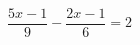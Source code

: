 \begin{ex}[type=equation]
	\begin{condition}
		$\dfrac{5x - 1}{9}-\dfrac{2x - 1}{6} = 2$
	\end{condition}
\end{ex}
